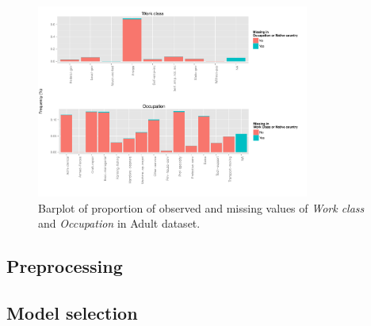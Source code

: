 \documentclass[10pt,twocolumn,letterpaper]{article}
\begin{document}
\begin{figure}[htbp] 
   \centering
   \includegraphics[width=0.8\textwidth]{./figure/barplot-missing.pdf}
   \caption{Barplot of proportion of observed and missing values of \textit{Work class} and \textit{Occupation} in Adult dataset.}
   \label{fig:barplot-missing}
\end{figure}

\subsection{Preprocessing}


\subsection{Model selection}
\end{document}

